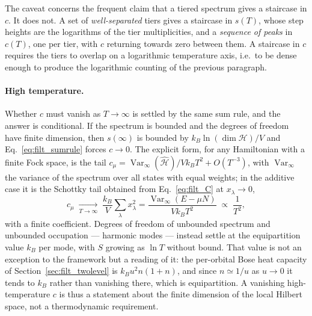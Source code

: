 \documentclass[10pt,a4paper]{article}
\theoremstyle{plain}
\theoremstyle{remark}
\newcommand{\Var}{\operatorname{Var}}
\begin{document}
The caveat concerns the frequent claim that a tiered spectrum gives a staircase
in $c$. It does not. A set of \emph{well-separated} tiers gives a staircase in
$s(T)$, whose step heights are the logarithms of the tier multiplicities, and a
\emph{sequence of peaks} in $c(T)$, one per tier, with $c$ returning towards zero
between them. A staircase in $c$ requires the tiers to overlap on a logarithmic
temperature axis, i.e.\ to be dense enough to produce the logarithmic counting of
the previous paragraph.

\paragraph{High temperature.} Whether $c$ must vanish as $T\to\infty$ is settled
by the same sum rule, and the answer is conditional. If the spectrum is bounded
and the degrees of freedom have finite dimension, then $s(\infty)$ is bounded by
$k_B\ln(\dim\mathcal{H})/V$ and Eq.~\eqref{eq:filt_sumrule} forces $c\to0$. The
explicit form, for any Hamiltonian with a finite Fock space, is the tail
$c_\mu=\Var_\infty(\hat{\mathcal H})/Vk_BT^{2}+O(T^{-3})$, with $\Var_\infty$
the variance of the spectrum over all states with equal weights; in the
additive case it is the Schottky tail obtained from
Eq.~\eqref{eq:filt_C} at $x_\lambda\to0$,
\begin{equation}\label{eq:filt_schottky}
c_\mu\;\xrightarrow[T\to\infty]{}\;\frac{k_B}{V}\sum_\lambda x_\lambda^{2}
=\frac{\Var_\infty(E-\mu N)}{Vk_BT^{2}}\;\propto\;\frac{1}{T^{2}},
\end{equation}
with a finite coefficient. Degrees of freedom of unbounded spectrum and unbounded
occupation --- harmonic modes --- instead settle at the equipartition value $k_B$
per mode, with $S$ growing as $\ln T$ without bound. That value is not an
exception to the framework but a reading of it: the per-orbital Bose heat capacity of
Section~\ref{sec:filt_twolevel} is $k_Bu^{2}n(1+n)$, and since $n\simeq1/u$ as
$u\to0$ it tends to $k_B$ rather than vanishing there, which is equipartition. A vanishing
high-temperature $c$ is thus a statement about the finite dimension of the local
Hilbert space, not a thermodynamic requirement.
\end{document}
